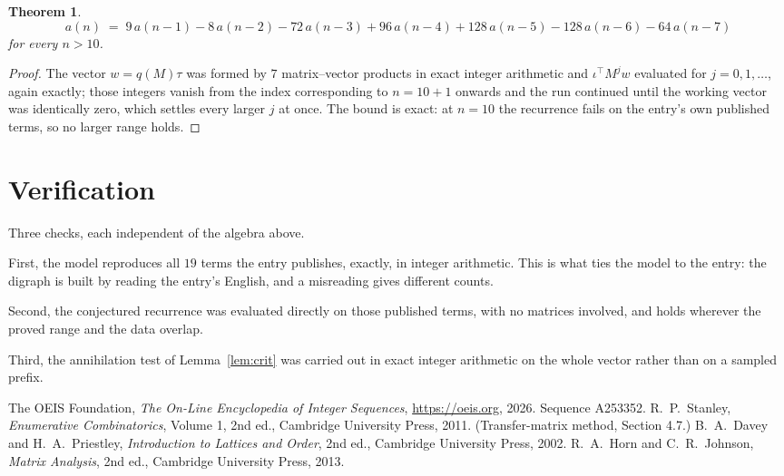 \documentclass[11pt,a4paper]{article}
\theoremstyle{plain}
\newtheorem{theorem}{Theorem}
\theoremstyle{definition}
\begin{document}
\begin{theorem}
\[
a(n)\;=\;9\,a(n-1) - 8\,a(n-2) - 72\,a(n-3) + 96\,a(n-4) + 128\,a(n-5) - 128\,a(n-6) - 64\,a(n-7)
\]
for every $n>10$.
\end{theorem}

\begin{proof}
The vector $w=q(M)\tau$ was formed by $7$ matrix--vector products in exact integer
arithmetic and $\iota^{\!\top}M^{j}w$ evaluated for $j=0,1,\dots$, again exactly; those
integers vanish from the index corresponding to $n=10+1$ onwards and the run continued
until the working vector was identically zero, which settles every larger $j$ at once. The bound is exact: at $n=10$ the recurrence fails on the entry's own published terms, so no larger range holds.
\end{proof}

\section{Verification}

Three checks, each independent of the algebra above.

First, the model reproduces all $19$ terms the entry publishes, exactly, in integer
arithmetic. This is what ties the model to the entry: the digraph is built by reading the
entry's English, and a misreading gives different counts.

Second, the conjectured recurrence was evaluated directly on those published terms, with no
matrices involved, and holds wherever the proved range and the data overlap.

Third, the annihilation test of Lemma~\ref{lem:crit} was carried out in exact integer
arithmetic on the whole vector rather than on a sampled prefix.

\begin{thebibliography}{9}
 The OEIS Foundation, \emph{The On-Line Encyclopedia of Integer
Sequences}, \url{https://oeis.org}, 2026. Sequence A253352.
 R.~P.~Stanley, \emph{Enumerative Combinatorics}, Volume 1, 2nd ed.,
Cambridge University Press, 2011. (Transfer-matrix method, Section 4.7.)
 B.~A.~Davey and H.~A.~Priestley, \emph{Introduction to Lattices and
Order}, 2nd ed., Cambridge University Press, 2002.
 R.~A.~Horn and C.~R.~Johnson, \emph{Matrix Analysis}, 2nd ed., Cambridge
University Press, 2013.
\end{thebibliography}
\end{document}
